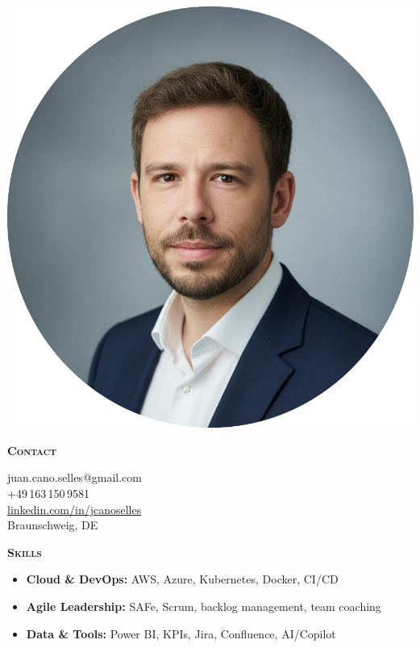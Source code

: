 \documentclass[11pt, a4paper]{article}
\newcommand{\headleft}[1]{\vspace*{2ex}\textsc{\textbf{\color{softwhite}#1}}\par%
  \vspace*{-1.2ex}{\color{softwhite}\hrulefill}\par\vspace*{0.7ex}}
\newlength{\SideBarW}
\begin{document}
\pagestyle{empty}
\setlength{\parindent}{0pt}
\setlength{\parskip}{0pt}
\setlength{\topskip}{0pt}
\raggedbottom

\noindent\begin{minipage}[t][\textheight][t]{\textwidth}

\colorbox{cvblue!90}{%
  \parbox[t][\textheight][t]{\SideBarW}{%
    \hspace*{4mm}%
    \begin{minipage}[t]{\dimexpr\linewidth-8mm\relax}
      \color{softwhite}
      \vspace*{6mm}
      \begin{center}
        \includegraphics[width=0.9\linewidth]{Resume_Juan_Cano.png}
      \end{center}

      \headleft{Contact}
      \small
      juan.cano.selles@gmail.com \\[0.4ex]
      +49\,163\,150\,9581 \\[0.4ex]
      \href{https://www.linkedin.com/in/jcanoselles/}{linkedin.com/in/jcanoselles} \\[0.4ex]
      Braunschweig, DE
      \normalsize

      \headleft{Skills}
      \begin{itemize}[leftmargin=*, itemsep=0.5ex]
        \item \textbf{Cloud \& DevOps:} AWS, Azure, Kubernetes, Docker, CI/CD
        \item \textbf{Agile Leadership:} SAFe, Scrum, backlog management, team coaching
        \item \textbf{Data \& Tools:} Power BI, KPIs, Jira, Confluence, AI/Copilot
      \end{itemize}


\end{minipage}}}
\end{minipage}
\end{document}
